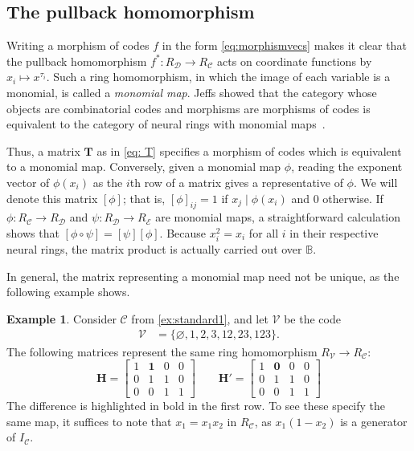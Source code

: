 \documentclass[11pt,letterpaper, reqno]{amsart}
\theoremstyle{definition}
\newtheorem{ex}[thm]{Example}        %
\def\B{\mathbb{B}}
\def\bH{\mathbf{H}}
\def\bT{\mathbf{T}}
\def\cC{\mathcal{C}}
\def\cD{\mathcal{D}}
\def\cE{\mathcal{E}}
\def\cV{\mathcal{V}}
\begin{document}
    

\subsection{The pullback homomorphism}\label{sec:pullback}
    Writing a morphism of codes $f$ in the form \eqref{eq:morphismvecs} makes it clear that the pullback homomorphism $f^*: R_\cD \to R_\cC$ acts on coordinate functions by $x_i \mapsto x^{\tau_i}$.
    Such a ring homomorphism, in which the image of each variable is a monomial, is called a \emph{monomial map}.
    Jeffs showed that the category whose objects are combinatorial codes and morphisms are morphisms of codes is equivalent to the category of neural rings with monomial maps~\cite{morphisms}.

    Thus, a matrix $\bT$ as in \eqref{eq: T} specifies a morphism of codes which is equivalent to a monomial map. Conversely, given a monomial map $\phi$, reading the exponent vector of $\phi(x_i)$ as the  $i$th row of a matrix gives a representative of $\phi$.
    We will denote this matrix $[\phi]$; that is, $[\phi]_{ij} = 1$ if $x_j \mid \phi(x_i)$ and $0$ otherwise.
    If $\phi: R_\cC \to R_\cD$ and $\psi: R_\cD \to R_\cE$ are monomial maps, a straightforward calculation shows that $[\phi \circ \psi] = [\psi][\phi]$. Because $x_i^2 = x_i$ for all $i$ in their respective neural rings, the matrix product is actually carried out over $\B$.

    In general, the matrix representing a monomial map need not be unique, as the following example shows.
    \begin{ex}\label{ex:nonuniquemonomialmap}
        Consider $\cC$ from \cref{ex:standard1}, and let $\cV$ be the code
        \begin{align*}
        \cV & = \{\varnothing, 1,2,3,12,23,123\}.
        \end{align*}
        The following matrices represent the same ring homomorphism $R_\cV \to R_\cC$:
        \[ \bH = \begin{bmatrix}
            1 & \mathbf{1} & 0 & 0\\
            0 & 1 & 1 & 0\\
            0 & 0 & 1 & 1
        \end{bmatrix}
        \qquad
        \bH' = \begin{bmatrix}
            1 & \mathbf{0} & 0 & 0\\
            0 & 1 & 1 & 0\\
            0 & 0 & 1 & 1
        \end{bmatrix}\]
        The difference is highlighted in bold in the first row. To see these specify the same map, it suffices to note that $x_1 = x_1x_2$ in $R_\cC$, as $x_1(1-x_2)$ is a generator of $I_\cC$.
    \end{ex}
\end{document}
